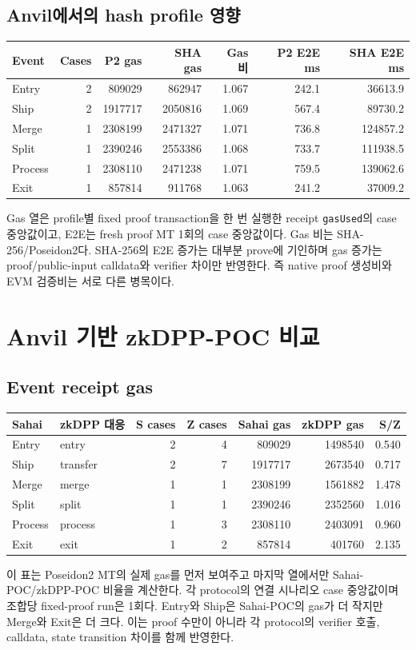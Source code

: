 \documentclass[10pt]{article}
\begin{document}
\subsection{Anvil에서의 hash profile 영향}
\begin{longtable}{lrrrrrr}
\toprule Event & Cases & P2 gas & SHA gas & Gas 비 & P2 E2E ms & SHA E2E ms\\
\midrule\endhead
Entry & 2 & 809029 & 862947 & 1.067 & 242.1 & 36613.9\\
Ship & 2 & 1917717 & 2050816 & 1.069 & 567.4 & 89730.2\\
Merge & 1 & 2308199 & 2471327 & 1.071 & 736.8 & 124857.2\\
Split & 1 & 2390246 & 2553386 & 1.068 & 733.7 & 111938.5\\
Process & 1 & 2308110 & 2471238 & 1.071 & 759.5 & 139062.6\\
Exit & 1 & 857814 & 911768 & 1.063 & 241.2 & 37009.2\\
\bottomrule\end{longtable}
Gas 열은 profile별 fixed proof transaction을 한 번 실행한 receipt \texttt{gasUsed}의 case 중앙값이고, E2E는 fresh proof MT 1회의 case 중앙값이다. Gas 비는 SHA-256/Poseidon2다. SHA-256의 E2E 증가는 대부분 prove에 기인하며 gas 증가는 proof/public-input calldata와 verifier 차이만 반영한다. 즉 native proof 생성비와 EVM 검증비는 서로 다른 병목이다.
\section{Anvil 기반 zkDPP-POC 비교}
\subsection{Event receipt gas}
\begin{longtable}{llrrrrr}
\toprule Sahai & zkDPP 대응 & S cases & Z cases & Sahai gas & zkDPP gas & S/Z\\
\midrule\endhead
Entry & entry & 2 & 4 & 809029 & 1498540 & 0.540\\
Ship & transfer & 2 & 7 & 1917717 & 2673540 & 0.717\\
Merge & merge & 1 & 1 & 2308199 & 1561882 & 1.478\\
Split & split & 1 & 1 & 2390246 & 2352560 & 1.016\\
Process & process & 1 & 3 & 2308110 & 2403091 & 0.960\\
Exit & exit & 1 & 2 & 857814 & 401760 & 2.135\\
\bottomrule\end{longtable}
이 표는 Poseidon2 MT의 실제 gas를 먼저 보여주고 마지막 열에서만 Sahai-POC/zkDPP-POC 비율을 계산한다. 각 protocol의 연결 시나리오 case 중앙값이며 조합당 fixed-proof run은 1회다. Entry와 Ship은 Sahai-POC의 gas가 더 작지만 Merge와 Exit은 더 크다. 이는 proof 수만이 아니라 각 protocol의 verifier 호출, calldata, state transition 차이를 함께 반영한다.
\end{document}
